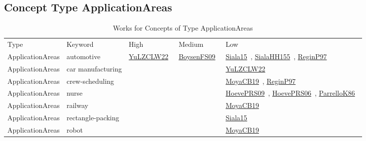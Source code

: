 \clearpage
\subsection{Concept Type ApplicationAreas}
\label{sec:ApplicationAreas}
{\scriptsize
\begin{longtable}{lp{3cm}>{\raggedright\arraybackslash}p{6cm}>{\raggedright\arraybackslash}p{6cm}>{\raggedright\arraybackslash}p{8cm}}
\rowcolor{white}\caption{Works for Concepts of Type ApplicationAreas}\\ \toprule
\rowcolor{white}Type & Keyword & High & Medium & Low\\ \midrule\endhead
\bottomrule
\endfoot
ApplicationAreas & automotive & \href{../cars/works/YuLZCLW22.pdf}{YuLZCLW22}~\cite{YuLZCLW22} & \href{../cars/works/BoysenFS09.pdf}{BoysenFS09}~\cite{BoysenFS09} & \href{../cars/works/Siala15.pdf}{Siala15}~\cite{Siala15}, \href{../cars/works/SialaHH155.pdf}{SialaHH155}~\cite{SialaHH155}, \href{../cars/works/ReginP97.pdf}{ReginP97}~\cite{ReginP97}\\
ApplicationAreas & car manufacturing &  &  & \href{../cars/works/YuLZCLW22.pdf}{YuLZCLW22}~\cite{YuLZCLW22}\\
ApplicationAreas & crew-scheduling &  &  & \href{../cars/works/MoyaCB19.pdf}{MoyaCB19}~\cite{MoyaCB19}, \href{../cars/works/ReginP97.pdf}{ReginP97}~\cite{ReginP97}\\
ApplicationAreas & nurse &  &  & \href{../cars/works/HoevePRS09.pdf}{HoevePRS09}~\cite{HoevePRS09}, \href{../cars/works/HoevePRS06.pdf}{HoevePRS06}~\cite{HoevePRS06}, \href{../cars/works/ParrelloK86.pdf}{ParrelloK86}~\cite{ParrelloK86}\\
ApplicationAreas & railway &  &  & \href{../cars/works/MoyaCB19.pdf}{MoyaCB19}~\cite{MoyaCB19}\\
ApplicationAreas & rectangle-packing &  &  & \href{../cars/works/Siala15.pdf}{Siala15}~\cite{Siala15}\\
ApplicationAreas & robot &  &  & \href{../cars/works/MoyaCB19.pdf}{MoyaCB19}~\cite{MoyaCB19}\\
\end{longtable}
}

